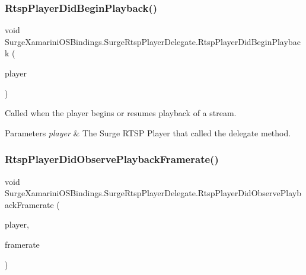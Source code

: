 \subsubsection{\texorpdfstring{Rtsp\+Player\+Did\+Begin\+Playback()}{RtspPlayerDidBeginPlayback()}}
{\footnotesize\ttfamily void Surge\+Xamarini\+O\+S\+Bindings.\+Surge\+Rtsp\+Player\+Delegate.\+Rtsp\+Player\+Did\+Begin\+Playback (\begin{DoxyParamCaption}\item[{\hyperlink{interface_surge_xamarini_o_s_bindings_1_1_surge_rtsp_player}{Surge\+Rtsp\+Player}}]{player }\end{DoxyParamCaption})}



Called when the player begins or resumes playback of a stream. 


\begin{DoxyParams}{Parameters}
{\em player} & The Surge R\+T\+SP Player that called the delegate method.\\
\hline
\end{DoxyParams}
\mbox{\label{interface_surge_xamarini_o_s_bindings_1_1_surge_rtsp_player_delegate_a96ebb6b82e20ba68d1b91bee632efd06}} 
\subsubsection{\texorpdfstring{Rtsp\+Player\+Did\+Observe\+Playback\+Framerate()}{RtspPlayerDidObservePlaybackFramerate()}}
{\footnotesize\ttfamily void Surge\+Xamarini\+O\+S\+Bindings.\+Surge\+Rtsp\+Player\+Delegate.\+Rtsp\+Player\+Did\+Observe\+Playback\+Framerate (\begin{DoxyParamCaption}\item[{\hyperlink{interface_surge_xamarini_o_s_bindings_1_1_surge_rtsp_player}{Surge\+Rtsp\+Player}}]{player,  }\item[{int}]{framerate }\end{DoxyParamCaption})}



